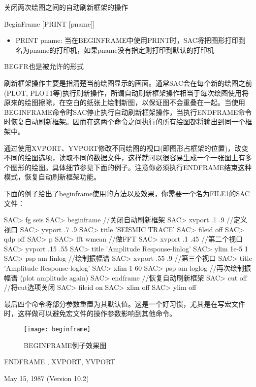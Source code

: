 \label{cmd:beginframe}

关闭两次绘图之间的自动刷新框架的操作

BeginFrame [PRINT [pname]]

\begin{itemize}
\item PRINT pname: 当在BEGINFRAME中使用PRINT时，SAC将把图形打印到名为pname的打印机，如果pname没有指定则打印到默认的打印机
\end{itemize}

BEGFR也是被允许的形式

刷新框架操作主要是指清楚当前绘图显示的画面。通常SAC会在每个新的绘图之前(PLOT, PLOT1等)执行刷新操作，所谓自动刷新框架操作相当于每次绘图使用将原来的绘图擦除，在空白的纸张上绘制新图，以保证图不会重叠在一起。当使用BEGINFRAME命令时SAC停止执行自动刷新框架操作，当执行ENDFRAME命令时恢复自动刷新框架。因而在这两个命令之间执行的所有绘图都将输出到同一个框架中。

通过使用XVPORT、YVPORT修改不同绘图的视口(即图形占框架的位置)，改变不同的绘图选项，读取不同的数据文件，这样就可以很容易生成一个一张图上有多个图形的绘图。具体细节参见下面的例子。注意你必须执行ENDFRAME结束这种模式，恢复自动刷新框架功能。

下面的例子给出了beginframe使用的方法以及效果，你需要一个名为FILE1的SAC文件：
\begin{SACCode}
SAC> fg seis
SAC> beginframe          //关闭自动刷新框架
SAC> xvport .1 .9        //定义视口
SAC> yvport .7 .9
SAC> title 'SEISMIC TRACE'
SAC> fileid off
SAC> qdp off
SAC> p
SAC> fft wmean           //做FFT
SAC> xvport .1 .45       //第二个视口
SAC> yvport .15 .55
SAC> title 'Amplitude Response-linlog'
SAC> ylim 1e-5 1
SAC> psp am linlog       //绘制振幅谱
SAC> xvport .55 .9       //第三个视口
SAC> title 'Amplitude Response-loglog'
SAC> xlim 1 60
SAC> psp am loglog       //再次绘制振幅谱 (plot amplitude again)
SAC> endframe            //恢复自动刷新框架
SAC> cut off             //将cut选项关闭
SAC> fileid on
SAC> xlim off
SAC> ylim off
\end{SACCode}
最后四个命令将部分参数重置为其默认值。这是一个好习惯，尤其是在写宏文件时，这样做可以避免宏文件的操作参数影响到其他命令。
\begin{figure}[h]
\centering
\texttt{[image: beginframe]}
\caption{BEGINFRAME例子效果图}
\end{figure}

ENDFRAME , XVPORT, YVPORT

May 15, 1987 (Version 10.2)
